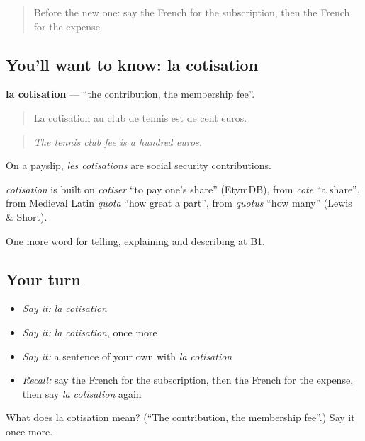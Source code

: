 \label{lesson:FR-C390-cotisation}



\begin{quote}
Before the new one: say the French for the subscription, then the French for the expense.
\end{quote}

\subsection*{You'll want to know: la cotisation}
\textbf{la cotisation} — \textquotedblleft{}the contribution, the membership fee\textquotedblright{}.

\begin{quote}
La cotisation au club de tennis est de cent euros.
\end{quote}

\begin{quote}
\emph{The tennis club fee is a hundred euros.}
\end{quote}

On a payslip, \emph{les cotisations} are social security contributions.

\begin{cousinweb}
\emph{cotisation} is built on \emph{cotiser} \textquotedblleft{}to pay one's share\textquotedblright{} (EtymDB), from \emph{cote} \textquotedblleft{}a share\textquotedblright{}, from Medieval Latin \emph{quota} \textquotedblleft{}how great a part\textquotedblright{}, from \emph{quotus} \textquotedblleft{}how many\textquotedblright{} (Lewis \& Short).
\end{cousinweb}

\begin{grammarlens}[title={What you've built}]
One more word for telling, explaining and describing at B1.
\end{grammarlens}

\subsection*{Your turn}
\begin{itemize}
\raggedright
  \item \emph{Say it:} \emph{la cotisation}
  \item \emph{Say it:} \emph{la cotisation}, once more
  \item \emph{Say it:} a sentence of your own with \emph{la cotisation}
  \item \emph{Recall:} say the French for the subscription, then the French for the expense, then say \emph{la cotisation} again
\end{itemize}

\begin{tcolorbox}[breakable,colback=teal!4,colframe=teal!35!black,title={Before you move on}]
What does la cotisation mean? (\textquotedblleft{}The contribution, the membership fee\textquotedblright{}.) Say it once more.
\end{tcolorbox}
